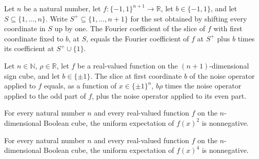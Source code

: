 \begin{theorem}
\label{FABL.fourierCoeff_slice_tail_add_insert}
\leanok
{}
Let $n$ be a natural number, let $f:\{-1,1\}^{n+1}\to\mathbb R$, let
$b\in\{-1,1\}$, and let $S\subseteq\{1,\ldots,n\}$. Write
$S^+\subseteq\{1,\ldots,n+1\}$ for the set obtained by shifting every coordinate in
$S$ up by one. The Fourier coefficient of the slice of $f$ with first coordinate fixed
to $b$, at $S$, equals the Fourier coefficient of $f$ at $S^+$ plus $b$ times its
coefficient at $S^+\cup\{1\}$.
\end{theorem}

\begin{theorem}
\label{FABL.firstCoordinateSlice_noiseOperator}
\leanok
{}
Let $n\in\mathbb N$, $\rho\in\mathbb R$, let $f$ be a real-valued function on the
$(n+1)$-dimensional sign cube, and let $b\in\{\pm1\}$. The slice at first coordinate $b$
of the noise operator applied to $f$ equals, as a function of $x\in\{\pm1\}^n$, $b\rho$
times the noise operator applied to the odd part of $f$, plus the noise operator applied
to its even part.
\end{theorem}

\begin{theorem}
\label{FABL.smallSet_expect_sq_nonneg}
\leanok
{}
For every natural number $n$ and every real-valued function $f$ on the $n$-dimensional
Boolean cube, the uniform expectation of $f(x)^2$ is nonnegative.
\end{theorem}

\begin{theorem}
\label{FABL.smallSet_expect_fourth_nonneg}
\leanok
{}
For every natural number $n$ and every real-valued function $f$ on the $n$-dimensional
Boolean cube, the uniform expectation of $f(x)^4$ is nonnegative.
\end{theorem}

